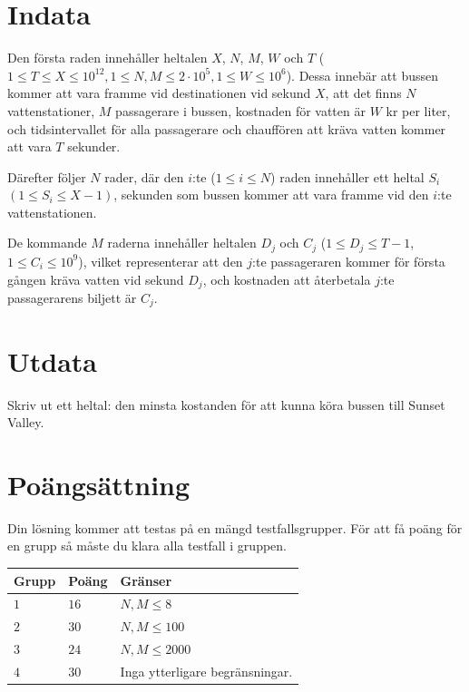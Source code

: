 



\section*{Indata}
Den första raden innehåller heltalen $X$, $N$, $M$, $W$ och $T$ ($1 \leq T \leq X \leq 10^{12}, 1 \leq N,M \leq 2\cdot 10^5, 1 \leq W \leq 10^6$). 
Dessa innebär att bussen kommer att vara framme vid destinationen vid sekund $X$, att det finns $N$ vattenstationer, $M$ passagerare i bussen, kostnaden för vatten är $W$ kr per liter, 
och tidsintervallet för alla passagerare och chauffören att kräva vatten kommer att vara $T$ sekunder.

Därefter följer $N$ rader, där den $i$:te ($1 \leq i \leq N$) raden innehåller ett heltal $S_i$ $(1 \leq S_i \leq X-1)$, sekunden som bussen kommer att
vara framme vid den $i$:te vattenstationen. 

De kommande $M$ raderna innehåller heltalen $D_j$ och $C_j$ ($1 \leq D_j \leq T-1$, $1 \leq C_i \leq 10^9$), vilket representerar
att den $j$:te passageraren kommer för första gången kräva vatten vid sekund $D_j$, och kostnaden att återbetala
$j$:te passagerarens biljett är $C_j$.

\section*{Utdata}
Skriv ut ett heltal: den minsta kostanden för att kunna köra bussen till Sunset Valley.

\section*{Poängsättning}
Din lösning kommer att testas på en mängd testfallsgrupper.
För att få poäng för en grupp så måste du klara alla testfall i gruppen.

\noindent
\begin{tabular}{| l | l | p{12cm} |}
  \hline
  \textbf{Grupp} & \textbf{Poäng} & \textbf{Gränser} \\ \hline
  $1$    & $16$         & $N,M \leq 8$  \\ \hline
  $2$    & $30$         & $N,M \leq 100$ \\ \hline
  $3$    & $24$         & $N,M \leq 2000$ \\ \hline
  $4$    & $30$         & Inga ytterligare begränsningar. \\ \hline
\end{tabular}

